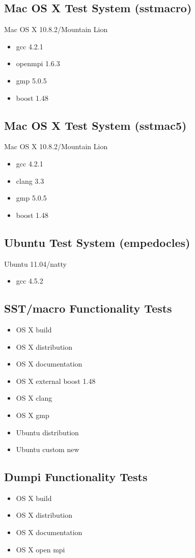 \begin{appendices}
\subsection{Mac OS X Test System (sstmacro)}
Mac OS X 10.8.2/Mountain Lion
\begin{itemize}
\item gcc 4.2.1
\item openmpi 1.6.3
\item gmp 5.0.5
\item boost 1.48
\end{itemize}

\subsection{Mac OS X Test System (sstmac5)}
Mac OS X 10.8.2/Mountain Lion
\begin{itemize}
\item gcc 4.2.1
\item clang 3.3
\item gmp 5.0.5
\item boost 1.48
\end{itemize}

\subsection{Ubuntu Test System (empedocles)}
Ubuntu 11.04/natty
\begin{itemize}
\item gcc 4.5.2
\end{itemize}

\subsection{SST/macro Functionality Tests}
\begin{itemize}
\item OS X build
\item OS X distribution
\item OS X documentation
\item OS X external boost 1.48
\item OS X clang 
\item OS X gmp
\item Ubuntu distribution
\item Ubuntu custom new
\end{itemize}

\subsection{Dumpi Functionality Tests}
\begin{itemize}
\item OS X build
\item OS X distribution
\item OS X documentation
\item OS X open mpi
\end{itemize}


\end{appendices}
